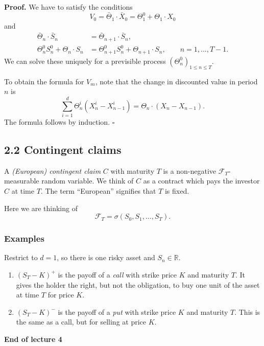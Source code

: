\documentclass[11pt,a4paper]{article}
\begin{document}
\medskip

\noindent\textbf{Proof.}
We have to satisfy the conditions
\[
V_0=\bar\Theta_1\cdot\bar X_0
=\Theta_1^0+\Theta_1\cdot X_0
\]
and
\[
\begin{aligned}
\bar\Theta_n\cdot\bar S_n
&=\bar\Theta_{n+1}\cdot\bar S_n,\\
\Theta_n^0S_n^0+\Theta_n\cdot S_n
&=\Theta_{n+1}^0S_n^0+\Theta_{n+1}\cdot S_n,
\qquad n=1,\ldots,T-1.
\end{aligned}
\]
We can solve these uniquely for a previsible process
$(\Theta_n^0)_{1\leq n\leq T}$.

To obtain the formula for $V_m$, note that the change in discounted value
in period $n$ is
\[
\sum_{i=1}^{d}\Theta_n^i(X_n^i-X_{n-1}^i)
=\Theta_n\cdot(X_n-X_{n-1}).
\]
The formula follows by induction.
\hfill$\square$

\subsection*{2.2 Contingent claims}

A \emph{(European) contingent claim} $C$ with maturity $T$ is a
non-negative $\mathcal{F}_T$-measurable random variable.
We think of $C$ as a contract which pays the investor $C$ at time $T$.
The term ``European'' signifies that $T$ is fixed.

Here we are thinking of
\[
\mathcal{F}_T=\sigma(S_0,S_1,\ldots,S_T).
\]

\subsubsection*{Examples}

Restrict to $d=1$, so there is one risky asset and $S_n\in\mathbb{R}$.

\begin{enumerate}
    \item[(a)] $(S_T-K)^+$ is the payoff of a \emph{call} with strike
    price $K$ and maturity $T$. It gives the holder the right, but not the
    obligation, to buy one unit of the asset at time $T$ for price $K$.

    \item[(b)] $(S_T-K)^-$ is the payoff of a \emph{put} with strike
    price $K$ and maturity $T$. This is the same as a call, but for
    selling at price $K$.
\end{enumerate}

\begin{center}
\textbf{End of lecture 4}
\end{center}
\end{document}
